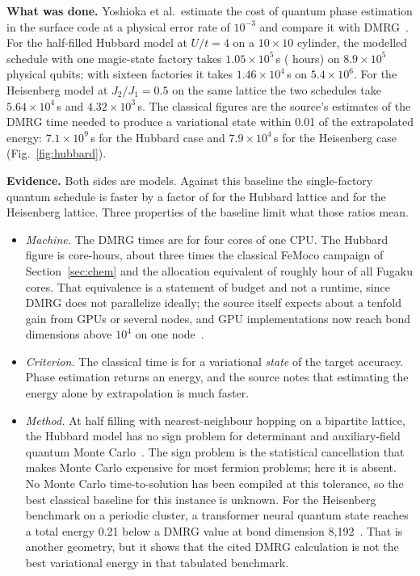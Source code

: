 \textbf{What was done.} Yoshioka et al.\ estimate the cost of quantum phase estimation in the surface code at a physical error rate of $10^{-3}$ and compare it with DMRG~\cite{yoshioka2024}. For the half-filled Hubbard model at $U/t=4$ on a $10\times10$ cylinder, the modelled schedule with one magic-state factory takes $1.05\times10^5$\,s (\hubTenQh{} hours) on $8.9\times10^5$ physical qubits; with sixteen factories it takes $1.46\times10^4$\,s on $5.4\times10^6$. For the Heisenberg model at $J_2/J_1=0.5$ on the same lattice the two schedules take $5.64\times10^4$\,s and $4.32\times10^3$\,s. The classical figures are the source's estimates of the DMRG time needed to produce a variational state within 0.01 of the extrapolated energy: $7.1\times10^9$\,s for the Hubbard case and $7.9\times10^4$\,s for the Heisenberg case (Fig.~\ref{fig:hubbard}).



\textbf{Evidence.} Both sides are models. Against this baseline the single-factory quantum schedule is faster by a factor of \ratioHubTen{} for the Hubbard lattice and \ratioHeis{} for the Heisenberg lattice. Three properties of the baseline limit what those ratios mean.
\begin{itemize}
\item \emph{Machine.} The DMRG times are for four cores of one CPU. The Hubbard figure is \hubTenCoreH{} core-hours, about three times the classical FeMoco campaign of Section~\ref{sec:chem} and the allocation equivalent of roughly \hubTenFugakuH{} hour of all Fugaku cores. That equivalence is a statement of budget and not a runtime, since DMRG does not parallelize ideally; the source itself expects about a tenfold gain from GPUs or several nodes, and GPU implementations now reach bond dimensions above $10^4$ on one node~\cite{legeza2026}.
\item \emph{Criterion.} The classical time is for a variational \emph{state} of the target accuracy. Phase estimation returns an energy, and the source notes that estimating the energy alone by extrapolation is much faster.
\item \emph{Method.} At half filling with nearest-neighbour hopping on a bipartite lattice, the Hubbard model has no sign problem for determinant and auxiliary-field quantum Monte Carlo~\cite{hirsch1985,leblanc2015}. The sign problem is the statistical cancellation that makes Monte Carlo expensive for most fermion problems; here it is absent. No Monte Carlo time-to-solution has been compiled at this tolerance, so the best classical baseline for this instance is unknown. For the Heisenberg benchmark on a periodic cluster, a transformer neural quantum state reaches a total energy 0.21 below a DMRG value at bond dimension 8{,}192~\cite{rende2024}. That is another geometry, but it shows that the cited DMRG calculation is not the best variational energy in that tabulated benchmark.
\end{itemize}

